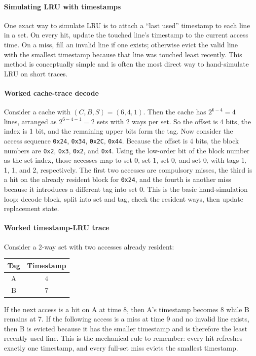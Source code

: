 \paragraph{Simulating LRU with timestamps}\label{par:auto-019b}
One exact way to simulate LRU is to attach a ``last used'' timestamp to each line in a set.
On every hit, update the touched line's timestamp to the current access time.
On a miss, fill an invalid line if one exists; otherwise evict the valid line with the smallest timestamp because that line was touched least recently.
This method is conceptually simple and is often the most direct way to hand-simulate LRU on short traces.

\paragraph{Worked cache-trace decode}\label{par:auto-019bb}
Consider a cache with $(C,B,S)=(6,4,1)$.
Then the cache has $2^{6-4}=4$ lines, arranged as $2^{6-4-1}=2$ sets with 2 ways per set.
So the offset is 4 bits, the index is 1 bit, and the remaining upper bits form the tag.
Now consider the access sequence \texttt{0x24}, \texttt{0x34}, \texttt{0x2C}, \texttt{0x44}.
Because the offset is 4 bits, the block numbers are \texttt{0x2}, \texttt{0x3}, \texttt{0x2}, and \texttt{0x4}.
Using the low-order bit of the block number as the set index, those accesses map to set 0, set 1, set 0, and set 0, with tags 1, 1, 1, and 2, respectively.
The first two accesses are compulsory misses, the third is a hit on the already resident block for \texttt{0x24}, and the fourth is another miss because it introduces a different tag into set 0.
This is the basic hand-simulation loop: decode block, split into set and tag, check the resident ways, then update replacement state.

\paragraph{Worked timestamp-LRU trace}\label{par:auto-019d}
Consider a 2-way set with two accesses already resident:
\begin{center}
    \begin{tabular}{|c|c|}
        \hline
        Tag & Timestamp \\
        \hline
        A   & 4         \\
        \hline
        B   & 7         \\
        \hline
    \end{tabular}
\end{center}
If the next access is a hit on A at time 8, then A's timestamp becomes 8 while B remains at 7.
If the following access is a miss at time 9 and no invalid line exists, then B is evicted because it has the smaller timestamp and is therefore the least recently used line.
This is the mechanical rule to remember: every hit refreshes exactly one timestamp, and every full-set miss evicts the smallest timestamp.

